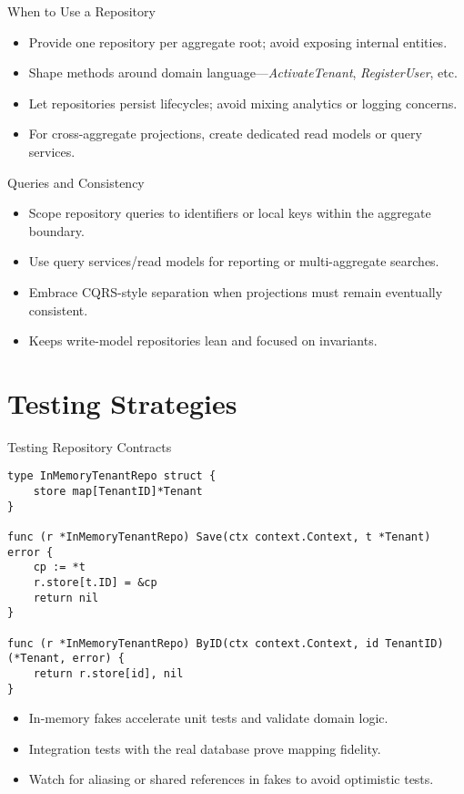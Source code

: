 \documentclass{beamer}
\begin{document}
\begin{frame}{When to Use a Repository}
  \begin{itemize}
    \item Provide one repository per aggregate root; avoid exposing internal entities.
    \item Shape methods around domain language—\textit{ActivateTenant}, \textit{RegisterUser}, etc.
    \item Let repositories persist lifecycles; avoid mixing analytics or logging concerns.
    \item For cross-aggregate projections, create dedicated read models or query services.
  \end{itemize}
\end{frame}

\begin{frame}{Queries and Consistency}
  \begin{itemize}
    \item Scope repository queries to identifiers or local keys within the aggregate boundary.
    \item Use query services/read models for reporting or multi-aggregate searches.
    \item Embrace CQRS-style separation when projections must remain eventually consistent.
    \item Keeps write-model repositories lean and focused on invariants.
  \end{itemize}
\end{frame}

\section{Testing Strategies}

\begin{frame}[fragile]{Testing Repository Contracts}
  \begin{lstlisting}
type InMemoryTenantRepo struct {
    store map[TenantID]*Tenant
}

func (r *InMemoryTenantRepo) Save(ctx context.Context, t *Tenant) error {
    cp := *t
    r.store[t.ID] = &cp
    return nil
}

func (r *InMemoryTenantRepo) ByID(ctx context.Context, id TenantID) (*Tenant, error) {
    return r.store[id], nil
}
  \end{lstlisting}
  \begin{itemize}
    \item In-memory fakes accelerate unit tests and validate domain logic.
    \item Integration tests with the real database prove mapping fidelity.
    \item Watch for aliasing or shared references in fakes to avoid optimistic tests.
  \end{itemize}
\end{frame}
\end{document}
